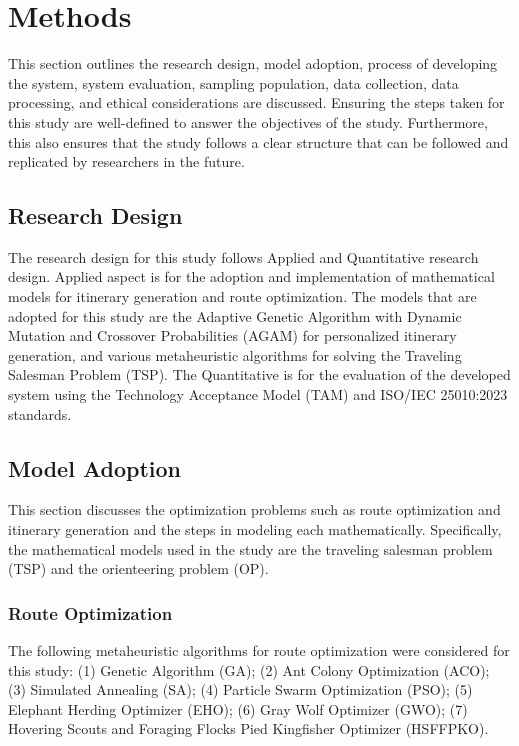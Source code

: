 \section{Methods}

This section outlines the research design, model adoption, process of developing the system, system evaluation, sampling population, data collection, data processing, and ethical considerations are discussed. Ensuring the steps taken for this study are well-defined to answer the objectives of the study. Furthermore, this also ensures that the study follows a clear structure that can be followed and replicated by researchers in the future.

\subsection{Research Design}

The research design for this study follows Applied and Quantitative research design. Applied aspect is for the adoption and implementation of mathematical models for itinerary generation and route optimization. The models that are adopted for this study are the Adaptive Genetic Algorithm with Dynamic Mutation and Crossover Probabilities (AGAM) for personalized itinerary generation, and various metaheuristic algorithms for solving the Traveling Salesman Problem (TSP). The Quantitative is for the evaluation of the developed system using the Technology Acceptance Model (TAM) and ISO/IEC 25010:2023 standards.

\subsection{Model Adoption}

This section discusses the optimization problems such as route optimization and itinerary generation and the steps in modeling each mathematically. Specifically, the mathematical models used in the study are the traveling salesman problem (TSP) and the orienteering problem (OP).

\subsubsection{Route Optimization}

The following metaheuristic algorithms for route optimization were considered for this study: (1) Genetic Algorithm (GA); (2) Ant Colony Optimization (ACO); (3) Simulated Annealing (SA); (4) Particle Swarm Optimization (PSO); (5) Elephant Herding Optimizer (EHO); (6) Gray Wolf Optimizer (GWO); (7) Hovering Scouts and Foraging Flocks Pied Kingfisher Optimizer (HSFFPKO).

